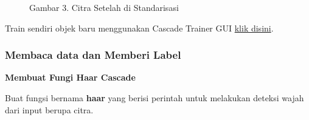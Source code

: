 \documentclass[
  letterpaper,
  DIV=11,
  numbers=noendperiod]{scrreprt}
\begin{document}
\begin{figure}
\begin{minipage}[t]{0.50\linewidth}
{{}

\caption{Gambar 3. Citra Setelah di Standarisasi}

}

\end{minipage}%

\end{figure}

\begin{tcolorbox}[enhanced jigsaw, opacityback=0, colbacktitle=quarto-callout-tip-color!10!white, breakable, titlerule=0mm, left=2mm, toptitle=1mm, rightrule=.15mm, leftrule=.75mm, colback=white, opacitybacktitle=0.6, arc=.35mm, toprule=.15mm, coltitle=black, colframe=quarto-callout-tip-color-frame, bottomtitle=1mm, title=\textcolor{quarto-callout-tip-color}{\faLightbulb}\hspace{0.5em}{Tip}, bottomrule=.15mm]

Train sendiri objek baru menggunakan Cascade Trainer GUI
\href{https://amin-ahmadi.com/cascade-trainer-gui/}{klik disini}.

\end{tcolorbox}

\hypertarget{membaca-data-dan-memberi-label}{%
\subsubsection*{Membaca data dan Memberi
Label}\label{membaca-data-dan-memberi-label}}

\textbf{Membuat Fungi Haar Cascade}

Buat fungsi bernama \textbf{haar} yang berisi perintah untuk melakukan
deteksi wajah dari input berupa citra.
\end{document}
